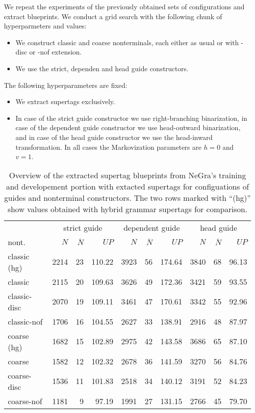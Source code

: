 \documentclass[../../document.tex]{subfiles}
\begin{document}
    We repeat the experiments of the previously obtained sets of configurations and extract  blueprints.
    We conduct a grid search with the following chunk of hyperparmeters and values:
    \begin{itemize}
        \item We construct classic and coarse nonterminals, each either as usual or with -disc or -nof extension.
        \item We use the strict, dependen and head guide constructors.
    \end{itemize}
    The following hyperparameters are fixed:
    \begin{itemize}
        \item We extract  supertags exclusively.
        \item In case of the strict guide constructor we use right-branching binarization, in case of the dependent guide constructor we use head-outward binarization, and in case of the head guide constructor we use the head-inward transformation. In all cases the Markovization parameters are $h=0$ and $v=1$.
    \end{itemize}

    \begin{table}
        \caption{\label{tbl:gridsearch:dcp:1}
            Overview of the extracted  supertag blueprints from NeGra's training and developement portion with extacted  supertags for configuations of guides and nonterminal constructors. The two rows marked with ``(hg)'' show values obtained with hybrid grammar supertags for comparison.
        }
        \centering
        \vspace{.2cm}
        \begin{tabular}{l|rrr|rrr|rrr}
            \toprule
                & \multicolumn{3}{c|}{strict guide} &  \multicolumn{3}{c|}{dependent guide} &  \multicolumn{3}{c}{head guide} \\
nont.           & $N$ & $\overline{N}$ & $\mathit{UP}$ & $N$ & $\overline{N}$ & $\mathit{UP}$ & $N$ & $\overline{N}$ & $\mathit{UP}$ \\ \hline
\rowcolor{black!10}
classic (hg) & 2214 & 23 & 110.22 & 3923 & 56 & 174.64 & 3840 & 68 & 96.13 \\\hline
classic      & 2115 & 20 & 109.63 & 3626 & 49 & 172.36 & 3421 & 59 & 93.55 \\
classic-disc & 2070 & 19 & 109.11 & 3461 & 47 & 170.61 & 3342 & 55 & 92.96 \\
classic-nof  & 1706 & 16 & 104.55 & 2627 & 33 & 138.91 & 2916 & 48 & 87.97 \\  \hline
\rowcolor{black!10}
coarse (hg)  & 1682 & 15 & 102.89 & 2975 & 42 & 143.58 & 3686 & 65 & 87.10 \\\hline
coarse       & 1582 & 12 & 102.32 & 2678 & 36 & 141.59 & 3270 & 56 & 84.76 \\
coarse-disc  & 1536 & 11 & 101.83 & 2518 & 34 & 140.12 & 3191 & 52 & 84.23 \\
coarse-nof   & 1181 & 9  & 97.19  & 1991 & 27 & 131.15 & 2766 & 45 & 79.70 \\
\bottomrule
        \end{tabular}
    \end{table}
\end{document}
